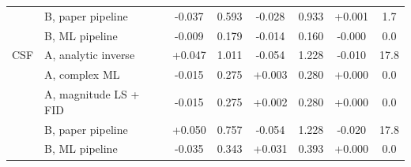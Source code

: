 \begin{table}[!htbp]
\begin{tabular}{llcccccc}
 & B, paper pipeline & -0.037 & 0.593 & -0.028 & 0.933 & +0.001 & 1.7\\
 & B, ML pipeline & -0.009 & 0.179 & -0.014 & 0.160 & -0.000 & 0.0\\
\midrule
CSF & A, analytic inverse & +0.047 & 1.011 & -0.054 & 1.228 & -0.010 & 17.8\\
 & A, complex ML & -0.015 & 0.275 & +0.003 & 0.280 & +0.000 & 0.0\\
 & A, magnitude LS + FID & -0.015 & 0.275 & +0.002 & 0.280 & +0.000 & 0.0\\
 & B, paper pipeline & +0.050 & 0.757 & -0.054 & 1.228 & -0.020 & 17.8\\
 & B, ML pipeline & -0.035 & 0.343 & +0.031 & 0.393 & +0.000 & 0.0\\
\bottomrule
\end{tabular}
\end{table}

